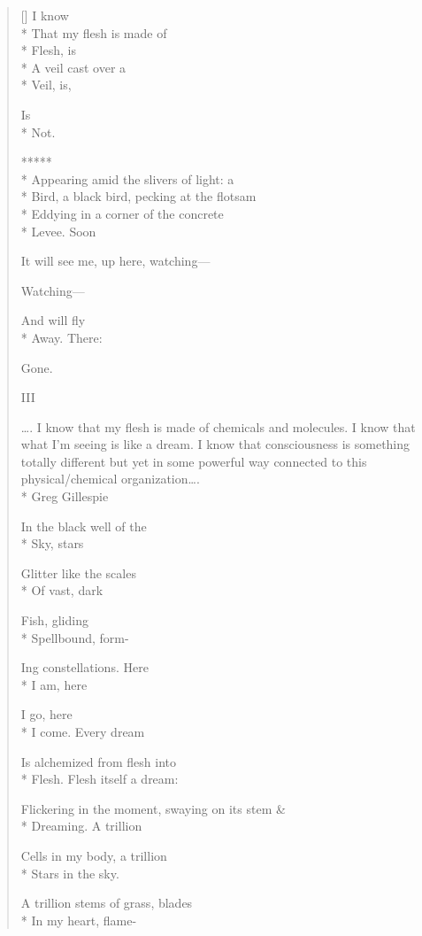 \begin{verse}[\versewidth]
I know\\*
That my flesh is made of\\*
Flesh, is\\*
A veil cast over a\\*
Veil, is,

Is\\*
Not.

     *****\\*
Appearing amid the slivers of light: a\\*
Bird, a black bird, pecking at the flotsam\\*
Eddying in a corner of the concrete\\*
Levee.     Soon

It will see me, up here, watching---

Watching---

And will fly\\*
Away.     There:

Gone.  

                        III

     \ldots . I know that my flesh is made of chemicals and molecules. I know that what I'm seeing is like a dream. I know that consciousness is something totally different but yet in some powerful way connected to this physical/chemical organization\ldots .\\*
                                                                                                    Greg Gillespie

In the black well of the\\*
Sky,   stars

Glitter like the scales\\*
Of vast, dark

Fish, gliding\\*
Spellbound,   form-

Ing constellations.   Here\\*
I am, here

I go, here\\*
I come.     Every dream

Is alchemized from flesh into\\*
Flesh.   Flesh itself a dream:

Flickering in the moment, swaying on its stem \&\\*
Dreaming.    A trillion

Cells in my body, a trillion\\*
Stars in the sky.

A trillion stems of grass, blades\\*
In my heart, flame-


\end{verse}
